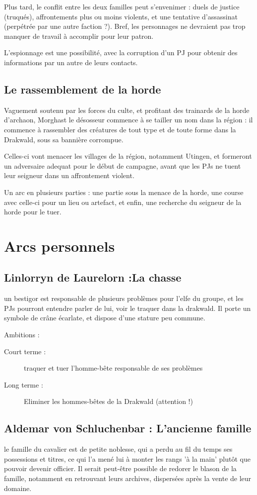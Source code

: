 \documentclass[10pt,a4paper]{book}
\begin{document}
Plus tard, le conflit entre les deux familles peut s'envenimer : duels de justice (truqués), affrontements plus ou moins violents, et une tentative d'assassinat (perpétrée par une autre faction ?). Bref, les personnages ne devraient pas trop manquer de travail à accomplir pour leur patron.

L'espionnage est une possibilité, avec la corruption d'un PJ pour obtenir des informations par un autre de leurs contacts.

\subsection{Le rassemblement de la horde}
Vaguement soutenu par les forces du culte, et profitant des trainards de la horde d'archaon, Morghast le désosseur commence à se tailler un nom dans la région : il commence à rassembler des créatures de tout type et de toute forme dans la Drakwald, sous sa bannière corrompue.

Celles-ci vont menacer les villages de la région, notamment Utingen, et formeront un adversaire adequat pour le début de campagne, avant que les PJs ne tuent leur seigneur dans un affrontement violent. 

Un arc en plusieurs parties : une partie sous la menace de la horde, une course avec celle-ci pour un lieu ou artefact, et enfin, une recherche du seigneur de la horde pour le tuer.
\section{Arcs personnels}
\subsection{Linlorryn de Laurelorn :La chasse}
un bestigor est responsable de plusieurs problèmes pour l'elfe du groupe, et les PJs pourront entendre parler de lui, voir le traquer dans la drakwald.
Il porte un symbole de crâne écarlate, et dispose d'une stature peu commune.

Ambitions :
\begin{description}
\item[Court terme :]traquer et tuer l'homme-bête responsable de ses problèmes
\item[Long terme :]Eliminer les hommes-bêtes de la Drakwald (attention !)
\end{description}
\subsection{Aldemar von Schluchenbar : L'ancienne famille}
le famille du cavalier est de petite noblesse, qui a perdu au fil du temps ses possessions et titres, ce qui l'a mené lui à monter les rangs 'à la main' plutôt que pouvoir devenir officier. Il serait peut-être possible de redorer le blason de la famille, notamment en retrouvant leurs archives, dispersées après la vente de leur domaine.
\end{document}

